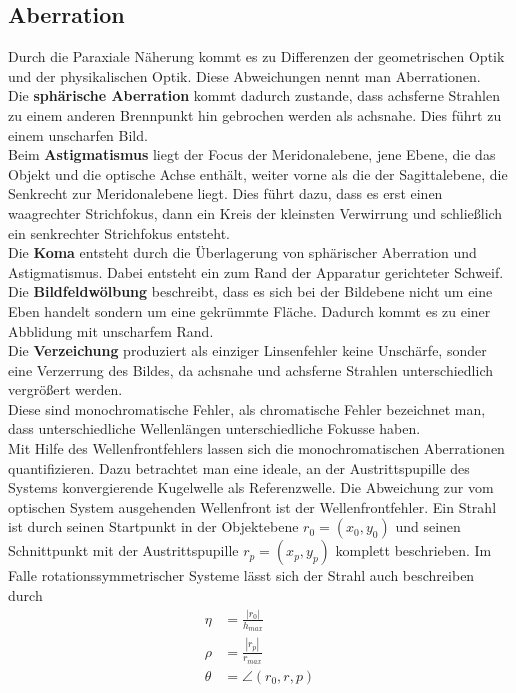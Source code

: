 \documentclass[twoside,colorback,accentcolor=tud4c,11pt]{tudreport}
\begin{document}
\subsection{Aberration}
Durch die Paraxiale Näherung kommt es zu Differenzen der geometrischen Optik und der physikalischen Optik. Diese Abweichungen nennt man Aberrationen.\\
Die \textbf{sphärische Aberration} kommt dadurch zustande, dass achsferne Strahlen zu einem anderen Brennpunkt hin gebrochen werden als achsnahe. Dies führt zu einem unscharfen Bild.\\
Beim \textbf{Astigmatismus} liegt der Focus der Meridonalebene, jene Ebene, die das Objekt und die optische Achse enthält, weiter vorne als die der Sagittalebene, die Senkrecht zur Meridonalebene liegt. Dies führt dazu, dass es erst einen waagrechter Strichfokus, dann ein Kreis der kleinsten Verwirrung und schließlich ein senkrechter Strichfokus entsteht.\\
Die \textbf{Koma} entsteht durch die Überlagerung von sphärischer Aberration und Astigmatismus. Dabei entsteht ein zum Rand der Apparatur gerichteter Schweif.\\
Die \textbf{Bildfeldwölbung} beschreibt, dass es sich bei der Bildebene nicht um eine Eben handelt sondern um eine gekrümmte Fläche. Dadurch kommt es zu einer Abblidung mit unscharfem Rand.\\
Die \textbf{Verzeichung} produziert als einziger Linsenfehler keine Unschärfe, sonder eine Verzerrung des Bildes, da achsnahe und achsferne Strahlen unterschiedlich vergrößert werden.\\
Diese sind monochromatische Fehler, als chromatische Fehler bezeichnet man, dass unterschiedliche Wellenlängen unterschiedliche Fokusse haben.\\
Mit Hilfe des Wellenfrontfehlers lassen sich die monochromatischen Aberrationen quantifizieren. Dazu betrachtet man eine ideale, an der Austrittspupille des Systems konvergierende Kugelwelle als Referenzwelle. Die Abweichung zur vom optischen System ausgehenden Wellenfront ist der Wellenfrontfehler. Ein Strahl ist durch seinen Startpunkt in der Objektebene $r_0 = (x_0, y_0)$ und seinen Schnittpunkt mit der Austrittspupille $r_p = (x_p, y_p)$ komplett beschrieben. Im Falle rotationssymmetrischer Systeme lässt sich der Strahl auch beschreiben durch
\begin{align}
\eta&=\frac{|r_0|}{h_{max}}\\
\rho&=\frac{|r_p|}{r_{max}}\\
\theta&=\angle(r_0,r,p)
\end{align}
\end{document}
